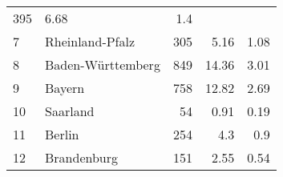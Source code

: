 \begin{longtable}{lXrrr}
       \num{395} &
       \num[round-mode=places,round-precision=2]{6.68} &
         \num[round-mode=places,round-precision=2]{1.4} \\

     7 &
     \multicolumn{1}{X}{ Rheinland-Pfalz   } &


       \num{305} &
       \num[round-mode=places,round-precision=2]{5.16} &
         \num[round-mode=places,round-precision=2]{1.08} \\

     8 &
     \multicolumn{1}{X}{ Baden-Württemberg   } &


       \num{849} &
       \num[round-mode=places,round-precision=2]{14.36} &
         \num[round-mode=places,round-precision=2]{3.01} \\

     9 &
     \multicolumn{1}{X}{ Bayern   } &


       \num{758} &
       \num[round-mode=places,round-precision=2]{12.82} &
         \num[round-mode=places,round-precision=2]{2.69} \\

     10 &
     \multicolumn{1}{X}{ Saarland   } &


       \num{54} &
       \num[round-mode=places,round-precision=2]{0.91} &
         \num[round-mode=places,round-precision=2]{0.19} \\

     11 &
     \multicolumn{1}{X}{ Berlin   } &


       \num{254} &
       \num[round-mode=places,round-precision=2]{4.3} &
         \num[round-mode=places,round-precision=2]{0.9} \\

     12 &
     \multicolumn{1}{X}{ Brandenburg   } &


       \num{151} &
       \num[round-mode=places,round-precision=2]{2.55} &
         \num[round-mode=places,round-precision=2]{0.54} \\


\end{longtable}
